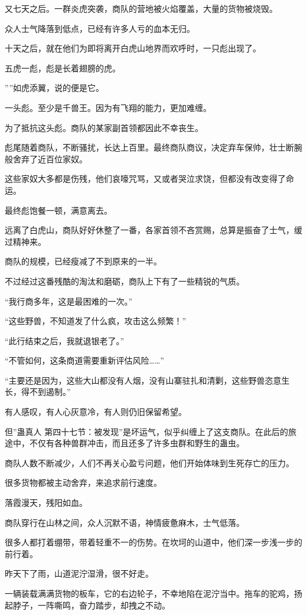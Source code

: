 \begin{this_body}
又七天之后。一群炎虎突袭，商队的营地被火焰覆盖，大量的货物被烧毁。

众人士气降落到低点，已经有许多人亏的血本无归。

十天之后，就在他们为即将离开白虎山地界而欢呼时，一只彪出现了。

五虎一彪，彪是长着翅膀的虎。

””如虎添翼，说的便是它。

一头彪。至少是千兽王。因为有飞翔的能力，更加难缠。

为了抵抗这头彪。商队的某家副首领都因此不幸丧生。

彪尾随着商队，不断骚扰，长达上百里。最终商队商议，决定弃车保帅，壮士断腕般舍弃了近百位家奴。

这些家奴大多都是伤残，他们哀嚎咒骂，又或者哭泣求饶，但都没有改变得了命运。

最终彪饱餐一顿，满意离去。

远离了白虎山，商队好好休整了一番，各家首领不吝赏赐，总算是振奋了士气，缓过精神来。

商队的规模，已经瘦减了不到原来的一半。

不过经过这番残酷的淘汰和磨砺，商队上下有了一些精锐的气质。

“我行商多年，这是最困难的一次。”

“这些野兽，不知道发了什么疯，攻击这么频繁！”

“此行结束之后，我就退银老了。”

“不管如何，这条商道需要重新评估风险……”

“主要还是因为，这些大山都没有人烟，没有山寨驻扎和清剿，这些野兽恣意生长，得不到遏制。”

有人感叹，有人心灰意冷，有人则仍旧保留希望。

但”蛊真人 第四十七节：被发现”是坏运气，似乎纠缠上了这支商队。在此后的旅途中，不仅有各种兽群冲击，而且还多了许多虫群和野生的蛊虫。

商队人数不断减少，人们不再关心盈亏问题，他们开始体味到生死存亡的压力。

很多货物都被主动舍弃，来追求前行速度。

落霞漫天，残阳如血。

商队穿行在山林之间，众人沉默不语，神情疲惫麻木，士气低落。

很多人都打着绷带，带着轻重不一的伤势。在坎坷的山道中，他们深一步浅一步的前行着。

昨天下了雨，山道泥泞湿滑，很不好走。

一辆装载满满货物的板车，它的右边轮子，不幸地陷在泥泞当中。拖车的驼鸡，扬起脖子，一阵嘶鸣，奋力踏步，却拽之不动。


\end{this_body}

